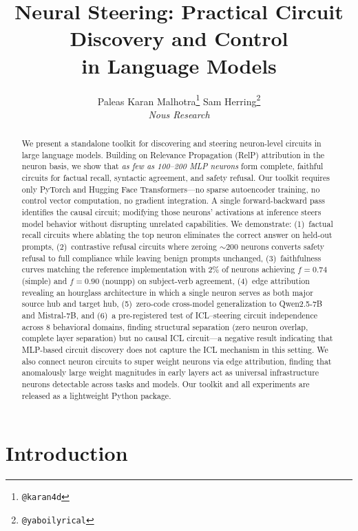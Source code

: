 \documentclass[11pt]{article}
\title{Neural Steering: Practical Circuit Discovery and Control \\ in Language Models}
\author{%
  Paleas
  \quad
  Karan Malhotra\thanks{\texttt{@karan4d}}
  \quad
  Sam Herring\thanks{\texttt{@yaboilyrical}} \\[6pt]
  \textit{Nous Research}
}
\begin{document}
\maketitle

\begin{abstract}
We present a standalone toolkit for discovering and steering neuron-level circuits in large language models.
Building on Relevance Propagation (RelP) attribution in the neuron basis, we show that \emph{as few as 100--200 MLP neurons} form complete, faithful circuits for factual recall, syntactic agreement, and safety refusal.
Our toolkit requires only PyTorch and Hugging Face Transformers---no sparse autoencoder training, no control vector computation, no gradient integration.
A single forward-backward pass identifies the causal circuit; modifying those neurons' activations at inference steers model behavior without disrupting unrelated capabilities.
We demonstrate: (1)~factual recall circuits where ablating the top neuron eliminates the correct answer on held-out prompts, (2)~contrastive refusal circuits where zeroing ${\sim}200$ neurons converts safety refusal to full compliance while leaving benign prompts unchanged, (3)~faithfulness curves matching the reference implementation with 2\% of neurons achieving $f{=}0.74$ (simple) and $f{=}0.90$ (nounpp) on subject-verb agreement, (4)~edge attribution revealing an hourglass architecture in which a single neuron serves as both major source hub and target hub, (5)~zero-code cross-model generalization to Qwen2.5-7B and Mistral-7B, and (6)~a pre-registered test of ICL--steering circuit independence across 8 behavioral domains, finding structural separation (zero neuron overlap, complete layer separation) but no causal ICL circuit---a negative result indicating that MLP-based circuit discovery does not capture the ICL mechanism in this setting.
We also connect neuron circuits to super weight neurons via edge attribution, finding that anomalously large weight magnitudes in early layers act as universal infrastructure neurons detectable across tasks and models.
Our toolkit and all experiments are released as a lightweight Python package.
\end{abstract}


\section{Introduction}
\label{sec:intro}
\end{document}
